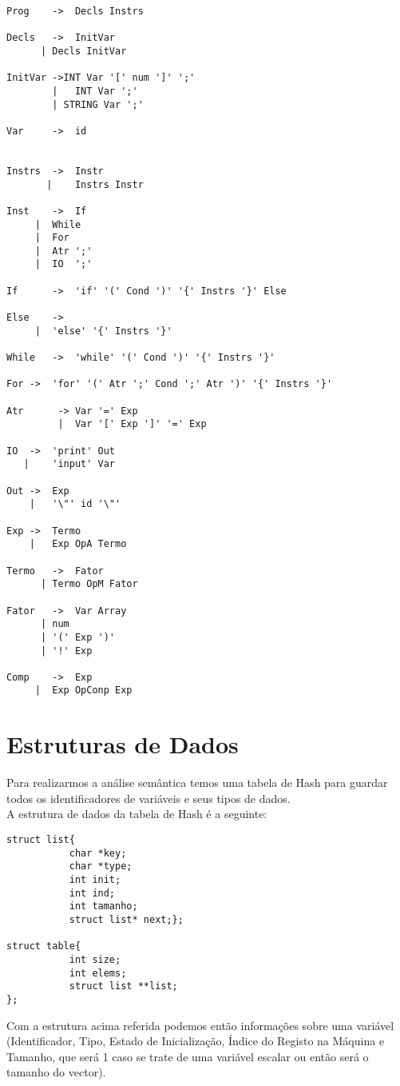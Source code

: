 \documentclass{report}
\begin{document}
\begin{verbatim}
Prog	->	Decls Instrs

Decls	->	InitVar
      |	Decls InitVar
		
InitVar	->INT Var '[' num ']' ';'
        |	INT Var ';'
        | STRING Var ';'
		
Var		->	id


Instrs	->	Instr
       |	Instrs Instr
		
Inst	->	If
     |	While
     |	For
     |	Atr	';'
     |	IO	';'
		
If		->	'if' '(' Cond ')' '{' Instrs '}' Else

Else	->
     |	'else' '{' Instrs '}'
		
While 	-> 	'while' '(' Cond ')' '{' Instrs '}'

For	->	'for' '(' Atr ';' Cond ';' Atr ')' '{' Instrs '}'

Atr      ->	Var '=' Exp
         |	Var '[' Exp ']' '=' Exp
		
IO	->	'print' Out
   |	'input' Var
	
Out	->	Exp
    |	'\"' id '\"'

Exp	->	Termo
    |	Exp OpA	Termo
		
Termo	->	Fator
      |	Termo OpM Fator
		
Fator	->	Var Array
      |	num
      |	'(' Exp ')'
      |	'!' Exp
		
Comp	->	Exp
     |	Exp OpConp Exp
\end{verbatim}

\section{Estruturas de Dados}
Para realizarmos a análise semântica temos uma tabela de Hash para guardar todos os identificadores de variáveis e seus tipos de dados. \\A estrutura de dados da tabela de Hash é a seguinte:\\
\begin{verbatim}
struct list{
           char *key;
           char *type;
           int init;
           int ind;
           int tamanho;
           struct list* next;};

struct table{
           int size;
           int elems;
           struct list **list;
};
\end{verbatim}
Com a estrutura acima referida podemos então informações sobre uma variável (Identificador, Tipo, Estado de Inicialização, Índice do Registo na Máquina e Tamanho, que será 1 caso se trate de uma variável escalar ou então será o tamanho do vector).
\end{document}
